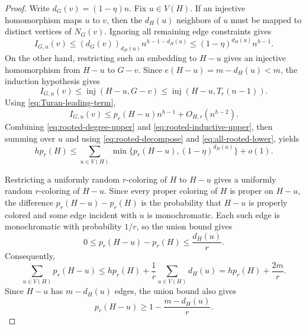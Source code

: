 \documentclass[11pt]{article}
\numberwithin{equation}{section}
\theoremstyle{definition}
\theoremstyle{remark}
\newcommand{\inj}{\operatorname{inj}}
\begin{document}
\begin{proof}
Write $d_G(v)=(1-\eta)n$. Fix $u\in V(H)$. If an injective homomorphism maps $u$ to $v$, then the $d_H(u)$ neighbors of $u$ must be mapped to distinct vertices of $N_G(v)$. Ignoring all remaining edge constraints gives
\begin{equation}
\label{eq:rooted-degree-upper}
I_{G,u}(v)\le (d_G(v))_{d_H(u)}n^{h-1-d_H(u)}
\le (1-\eta)^{d_H(u)}n^{h-1}.
\end{equation}
On the other hand, restricting such an embedding to $H-u$ gives an injective homomorphism from $H-u$ to $G-v$. Since $e(H-u)=m-d_H(u)<m$, the induction hypothesis gives
\[
I_{G,u}(v)\le \inj(H-u,G-v)
\le \inj(H-u,T_r(n-1)).
\]
Using \eqref{eq:Turan-leading-term},
\begin{equation}
\label{eq:rooted-inductive-upper}
I_{G,u}(v)\le p_r(H-u)n^{h-1}+O_{H,r}(n^{h-2}).
\end{equation}
Combining \eqref{eq:rooted-degree-upper} and \eqref{eq:rooted-inductive-upper}, then summing over $u$ and using \eqref{eq:rooted-decompose} and \eqref{eq:all-rooted-lower}, yields
\begin{equation}
\label{eq:calibration-master}
hp_r(H)\le \sum_{u\in V(H)}\min\{p_r(H-u),(1-\eta)^{d_H(u)}\}+o(1).
\end{equation}

Restricting a uniformly random $r$-coloring of $H$ to $H-u$ gives a uniformly random $r$-coloring of $H-u$. Since every proper coloring of $H$ is proper on $H-u$, the difference $p_r(H-u)-p_r(H)$ is the probability that $H-u$ is properly colored and some edge incident with $u$ is monochromatic. Each such edge is monochromatic with probability $1/r$, so the union bound gives
\[
0\le p_r(H-u)-p_r(H)\le \frac{d_H(u)}{r}.
\]
Consequently,
\begin{equation}
\label{eq:sum-deletion-probabilities}
\sum_{u\in V(H)}p_r(H-u)
\le hp_r(H)+\frac1r\sum_{u\in V(H)}d_H(u)
=hp_r(H)+\frac{2m}{r}.
\end{equation}
Since $H-u$ has $m-d_H(u)$ edges, the union bound also gives
\begin{equation}
\label{eq:deletion-probability-lower}
p_r(H-u)\ge 1-\frac{m-d_H(u)}{r}.
\end{equation}


\end{proof}
\end{document}
